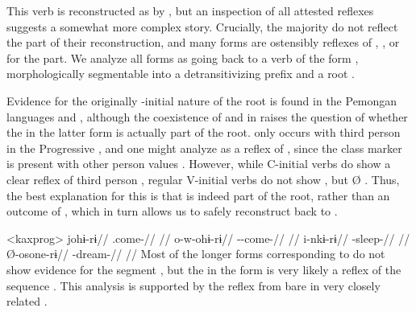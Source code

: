 

This verb is reconstructed as  by \textcite[30]{gildea2007greenberg}, but an inspection of all attested reflexes  suggests a somewhat more complex story.
Crucially, the majority do not reflect the  part of their reconstruction, and many forms are ostensibly reflexes of , , or  for the  part.
We analyze all forms as going back to a \PC verb of the form , morphologically segmentable into a detransitivizing prefix and a root .

Evidence for the originally -initial nature of the root is found in the Pemongan languages and \kaxui, although the coexistence of  and  in \kaxui raises the question of whether the  in the latter form is actually part of the root.
 only occurs with third person in the Progressive , and one might analyze  as a reflex of  , since the  class marker  is present with other person values .
However, while C-initial verbs do show a clear reflex of third person  , regular V-initial  verbs do not show , but Ø .
Thus, the best explanation for this  is that is indeed part of the root, rather than an outcome of , which in turn allows us to safely reconstruct  back to \PC.

\pex<kaxprog>\kaxui {}
\begingl
\gla johɨ-rɨ//
\glb {}.come-//
\glft {}//
\endgl
{}
\begingl
\gla o-w-ohɨ-rɨ//
\glb {}--come-//
\glft {}//
\endgl
{}
\begingl
\gla i-nkɨ-rɨ//
\glb {}-sleep-//
\glft {}//
\endgl
{}
\begingl
\gla Ø-osone-rɨ//
\glb {}-dream-//
\glft {}//
\endgl
\xe
%
Most of the longer forms corresponding to   do not show evidence for the segment , but the  in the \akawaio form  is very likely a reflex of the sequence .
This analysis is supported by the reflex  from bare  in very closely related \macushi.


